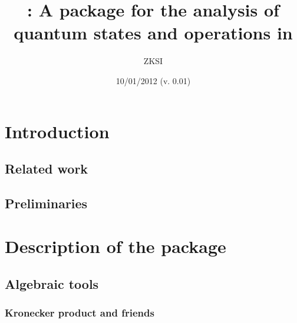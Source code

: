 \documentclass[11pt,a4paper]{article}
\title{\qi: A package for the analysis of quantum states and operations in
\Mathematica}
\date{10/01/2012 (v. 0.01)}
\author{ZKSI}
\begin{document}
\maketitle

\section{Introduction}

\subsection{Related work}

\subsection{Preliminaries}

\section{Description of the package}

\subsection{Algebraic tools}

\subsubsection{Kronecker product and friends}

\end{document}

